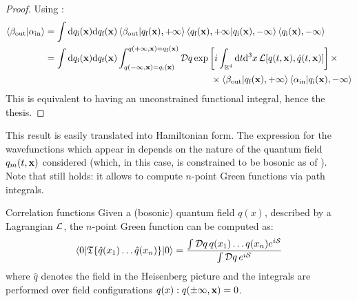 \begin{proofbox}
  \begin{proof}
    Using :
    \begin{equation*}
      \begin{split}
        \braket{\beta_\text{out} | \alpha_\text{in}}
        & = \int \mathrm{d} q_\text{i}(\mathbf{x}) \mathrm{d} q_\text{f}(\mathbf{x}) \braket{\beta_\text{out} | q_\text{f}(\mathbf{x}), +\infty} \braket{q_\text{f}(\mathbf{x}),+\infty | q_\text{i}(\mathbf{x}),-\infty} \braket{q_\text{i}(\mathbf{x}), -\infty} \\
        & = \int \mathrm{d} q_\text{i}(\mathbf{x}) \mathrm{d} q_\text{f}(\mathbf{x}) \int_{q(-\infty,\mathbf{x}) = q_\text{i}(\mathbf{x})}^{q(+\infty,\mathbf{x}) = q_\text{f}(\mathbf{x})} \mathcal{D}q \exp \left[ i \int_{\mathbb{R}^4} \mathrm{d} t \mathrm{d}^3 x\, \mathcal{L}[q(t,\mathbf{x}),\dot{q}(t,\mathbf{x})] \right] \times \\
        & \qquad \qquad \qquad \qquad \qquad \qquad \qquad \qquad \qquad \times \braket{\beta_\text{out} | q_\text{f}(\mathbf{x}), +\infty} \braket{\alpha_\text{in} | q_\text{i}(\mathbf{x}), -\infty}
      \end{split}
    \end{equation*}
    This is equivalent to having an unconstrained functional integral, hence the thesis.
  \end{proof}
\end{proofbox}

This result is easily translated into Hamiltonian form. The expression for the wavefunctions which appear in  depends on the nature of the quantum field $ q_m(t,\mathbf{x}) $ considered (which, in this case, is constrained to be bosonic as of ). \\
Note that  still holds: it allows to compute $ n $-point Green functions via path integrals.

\begin{proposition}{Correlation functions}{}
  Given a (bosonic) quantum field $ q(x) $, described by a Lagrangian $ \mathcal{L} $, the $ n $-point Green function can be computed as:
  \begin{equation}
    \braket{0 | \mathfrak{T}\{\hat{q}(x_1) \dots \hat{q}(x_n)\} | 0} = \frac{\int \mathcal{D}q\, q(x_1) \dots q(x_n) e^{i \mathcal{S}}}{\int \mathcal{D}q\, e^{i \mathcal{S}}}
    \label{eq:corr-func-path}
  \end{equation}
  where $ \hat{q} $ denotes the field in the Heisenberg picture and the integrals are performed over field configurations $ q(x) : q(\pm \infty, \mathbf{x}) = 0 $.
\end{proposition}

